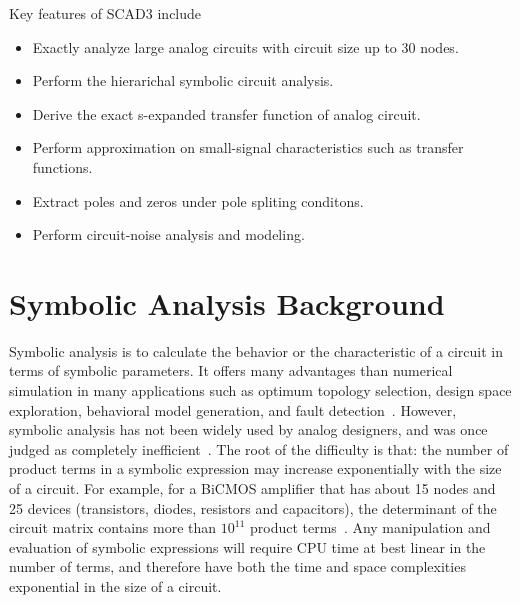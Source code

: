 Key features of SCAD3 include
\begin{itemize}
\item Exactly analyze large analog circuits with circuit size 
up to 30 nodes.
\item Perform the hierarichal symbolic circuit analysis. 
\item Derive the exact s-expanded transfer function of analog circuit.
\item Perform approximation on small-signal characteristics such as 
transfer functions. 
\item Extract poles and zeros under pole spliting conditons.
\item Perform circuit-noise analysis and modeling.
\end{itemize}

\section{Symbolic Analysis Background}
Symbolic analysis is to calculate the behavior or
the characteristic of a circuit in terms of symbolic parameters.
It offers many advantages than numerical simulation
in many applications such as optimum topology selection, 
design space exploration, behavioral model generation, 
and fault detection~\cite{GiWa94}.
However, symbolic analysis has not
been widely used by analog designers,
and was once judged as completely inefficient~\cite{McPe71}.
The root of the difficulty is that:
the number of product terms in a symbolic expression
may increase exponentially with the size of a circuit.
For example, for a BiCMOS amplifier that has
about 15 nodes and 25 devices (transistors, diodes,
resistors and capacitors), the determinant
of the circuit matrix contains more 
than $10^{11}$ product terms~\cite{WaGi96}.
Any manipulation and evaluation
of symbolic expressions will require CPU time
at best linear in the number of terms, 
and therefore have both the time and space complexities
exponential in the size of a circuit.

